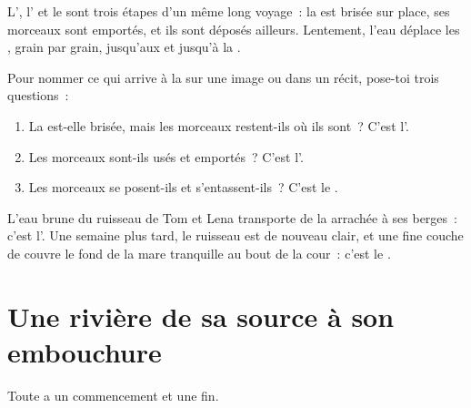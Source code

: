L', l' et le  sont trois étapes d'un même long
voyage~: la  est brisée sur place, ses morceaux sont emportés, et ils
sont déposés ailleurs. Lentement, l'eau déplace les , grain par
grain, jusqu'aux  et jusqu'à la .

\begin{method}\label{met:g5:water-shapes-the-land:naming}
Pour nommer ce qui arrive à la  sur une image ou dans un récit,
pose-toi trois questions~:
\begin{enumerate}
  \item La  est-elle brisée, mais les morceaux restent-ils où ils
        sont~? C'est l'\emph{}.
  \item Les morceaux sont-ils usés et emportés~? C'est
        l'\emph{}.
  \item Les morceaux se posent-ils et s'entassent-ils~? C'est le
        \emph{}.
\end{enumerate}
\end{method}

\begin{example}\label{ex:g5:water-shapes-the-land:stream}
L'eau brune du ruisseau de Tom et Lena transporte de la  arrachée à ses
berges~: c'est l'. Une semaine plus tard, le ruisseau est de nouveau
clair, et une fine couche de  couvre le fond de la mare tranquille au
bout de la cour~: c'est le .
\end{example}

\section{Une rivière de sa source à son embouchure}

Toute  a un commencement et une fin.

